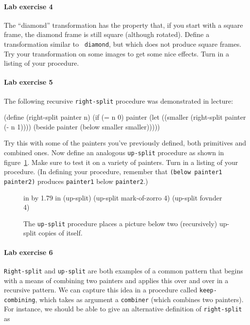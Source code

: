 \documentclass[11pt]{article}
\begin{document}
\paragraph{Lab exercise 4}

The ``diamond'' transformation has the property that, if you start
with a square frame, the diamond frame is still square
(although rotated).  Define a transformation similar to {\tt
diamond}, but which does not produce square frames.  Try your
transformation on some images to get some nice effects.  Turn in a
listing of your procedure.

\paragraph{Lab exercise 5}
The following recursive {\tt right-split} procedure was demonstrated
in lecture:

\beginlisp
(define (right-split painter n)
  (if (= n 0)
      painter
      (let ((smaller (right-split painter (- n 1))))
        (beside painter (below smaller smaller)))))
\endlisp

Try this with some of the painters you've previously defined, both
primitives and combined ones.  Now define an analogous {\tt up-split}
procedure as shown in figure~\ref{up-split}.  Make sure to test it on
a variety of painters.  Turn in a listing of your procedure.  (In
defining your procedure, remember that {\tt (below painter1
painter2)} produces {\tt painter1} below {\tt painter2}.)

\begin{figure}
 in by 1.79 in (up-split)
\beginlisp
                  (up-split mark-of-zorro 4)      (up-split fovnder 4)
\endlisp
\caption{{\protect\footnotesize
The {\tt up-split} procedure places a picture below two (recursively)
up-split copies of itself.}}
\label{up-split}
\end{figure} 


\paragraph{Lab exercise 6}
{\tt Right-split} and {\tt up-split} are both examples of a common
pattern that begins with a means of combining two painters and applies
this over and over in a recursive pattern.  We can capture this idea
in a procedure called {\tt keep-combining}, which takes as argument a
{\tt combiner} (which combines two painters).  For instance, we should
be able to give an alternative definition of {\tt right-split} as
\end{document}
